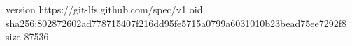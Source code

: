 version https://git-lfs.github.com/spec/v1
oid sha256:802872602ad778715407f216dd95fe5715a0799a6031010b23bead75ee7292f8
size 87536
